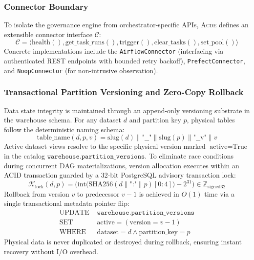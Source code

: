 \subsubsection{Connector Boundary}
To isolate the governance engine from orchestrator-specific APIs, \textsc{Acde} defines an extensible connector interface $\mathcal{C}$:
\begin{equation}
\mathcal{C} = \big\langle \text{health}(), \text{get\_task\_runs}(), \text{trigger}(), \text{clear\_tasks}(), \text{set\_pool}() \big\rangle
\end{equation}
Concrete implementations include the \texttt{AirflowConnector} (interfacing via authenticated REST endpoints with bounded retry backoff), \texttt{PrefectConnector}, and \texttt{NoopConnector} (for non-intrusive observation).

\subsubsection{Transactional Partition Versioning and Zero-Copy Rollback}
Data state integrity is maintained through an append-only versioning substrate in the warehouse schema. For any dataset $d$ and partition key $p$, physical tables follow the deterministic naming schema:
\begin{equation}
\text{table\_name}(d, p, v) = \text{slug}(d) \parallel \text{"\_\_"} \parallel \text{slug}(p) \parallel \text{"\_\_v"} \parallel v
\end{equation}
Active dataset views resolve to the specific physical version marked $\text{active} = \text{True}$ in the catalog $\texttt{warehouse.partition\_versions}$. To eliminate race conditions during concurrent DAG materializations, version allocation executes within an ACID transaction guarded by a 32-bit PostgreSQL advisory transaction lock:
\begin{equation}
\mathcal{K}_{\text{lock}}(d, p) = \Big(\text{int}\big(\text{SHA256}(d \parallel \text{":"} \parallel p)[0:4]\big) - 2^{31}\Big) \in \mathbb{Z}_{\text{signed32}}
\end{equation}
Rollback from version $v$ to predecessor $v-1$ is achieved in $O(1)$ time via a single transactional metadata pointer flip:
\begin{equation}
\begin{aligned}
\text{UPDATE } & \texttt{warehouse.partition\_versions} \\
\text{SET } & \text{active} = (\text{version} = v - 1) \\
\text{WHERE } & \text{dataset} = d \land \text{partition\_key} = p
\end{aligned}
\end{equation}
Physical data is never duplicated or destroyed during rollback, ensuring instant recovery without I/O overhead.

